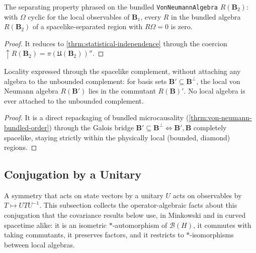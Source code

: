 \begin{theorem}
    \label{thrm:statistical-independence-bundled}
    \leanok
    The separating property phrased on the bundled \texttt{VonNeumannAlgebra} $R(\mathbf{B}_2)$: with $\Omega$ cyclic for the local observables of $\mathbf{B}_1$, every $R$ in the bundled algebra $R(\mathbf{B}_2)$ of a spacelike-separated region with $R\Omega = 0$ is zero.
\end{theorem}
\begin{proof}
    \leanok
    It reduces to \ref{thrm:statistical-independence} through the coercion $\uparrow R(\mathbf{B}_2) = \pi(\mathfrak{U}(\mathbf{B}_2))''$.
\end{proof}

\begin{theorem}
    \label{thrm:additive-free-locality}
    \leanok
    Locality expressed through the spacelike complement, without attaching any algebra to the unbounded complement: for basis sets $\mathbf{B}' \subseteq \mathbf{B}^\perp$, the local von Neumann algebra $R(\mathbf{B}')$ lies in the commutant $R(\mathbf{B})'$. No local algebra is ever attached to the unbounded complement.
\end{theorem}
\begin{proof}
    \leanok
    It is a direct repackaging of bundled microcausality (\ref{thrm:von-neumann-bundled-order}) through the Galois bridge $\mathbf{B}' \subseteq \mathbf{B}^\perp \iff \mathbf{B}', \mathbf{B}$ completely spacelike, staying strictly within the physically local (bounded, diamond) regions.
\end{proof}

\subsection{Conjugation by a Unitary}

A symmetry that acts on state vectors by a unitary $U$ acts on observables by $T \mapsto U T U^{-1}$. This subsection collects the operator-algebraic facts about this conjugation that the covariance results below use, in Minkowski and in curved spacetime alike: it is an isometric $*$-automorphism of $\mathcal{B}(H)$, it commutes with taking commutants, it preserves factors, and it restricts to $*$-isomorphisms between local algebras.

